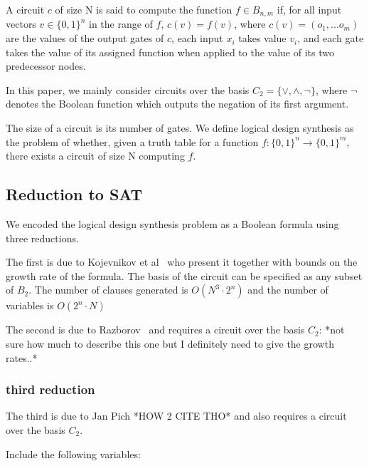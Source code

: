 \documentclass{article}
\begin{document}
A circuit \(c\) of size N is said to compute the function \(f\in B_{n,m}\) if, for all input vectors \(v\in\{0,1\}^n\) in the range of \(f\), \(c(v)=f(v)\), where \(c(v) = (o_1,...o_m)\) are the values of the output gates of \(c\), each input \(x_i\) takes value \(v_i\), and each gate takes the value of its assigned function when applied to the value of its two predecessor nodes.

In this paper, we mainly consider circuits over the basis \(C_2 = \{\lor, \land, \neg\}\), where \(\neg\) denotes the Boolean function which outputs the negation of its first argument.

The size of a circuit is its number of gates. We define logical design synthesis as the problem of whether, given a truth table for a function \(f: \{0,1\}^n \to \{0,1\}^m\), there exists a circuit of size N computing \(f\).

\subsection{Reduction to SAT}

We encoded the logical design synthesis problem as a Boolean formula using three reductions.

The first is due to Kojevnikov et al~\cite{kulikov} who present it together with bounds on the growth rate of the formula. The basis of the circuit can be specified as any subset of \(B_2\). The number of clauses generated is \(O(N^3\cdot2^n)\) and the number of variables is \(O(2^n\cdot N)\)

The second is due to Razborov~\cite{raz} and requires a circuit over the basis \(C_2\): *not sure how much to describe this one but I definitely need to give the growth rates..*

\subsubsection{third reduction}

The third is due to Jan Pich *HOW 2 CITE THO* and also requires a circuit over the basis \(C_2\).


Include the following variables:
\end{document}
